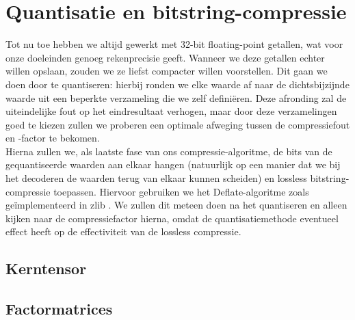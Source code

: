 \section{Quantisatie en bitstring-compressie}

Tot nu toe hebben we altijd gewerkt met 32-bit floating-point getallen, wat voor onze doeleinden genoeg rekenprecisie geeft. Wanneer we deze getallen echter willen opslaan, zouden we ze liefst compacter willen voorstellen. Dit gaan we doen door te quantiseren: hierbij ronden we elke waarde af naar de dichtsbijzijnde waarde uit een beperkte verzameling die we zelf defini\"eren. Deze afronding zal de uiteindelijke fout op het eindresultaat verhogen, maar door deze verzamelingen goed te kiezen zullen we proberen een optimale afweging tussen de compressiefout en -factor te bekomen.\\

Hierna zullen we, als laatste fase van ons compressie-algoritme, de bits van de gequantiseerde waarden aan elkaar hangen (natuurlijk op een manier dat we bij het decoderen de waarden terug van elkaar kunnen scheiden) en lossless bitstring-compressie toepassen. Hiervoor gebruiken we het Deflate-algoritme \cite{ref:deflate} zoals ge\"implementeerd in zlib \cite{ref:zlib}. We zullen dit meteen doen na het quantiseren en alleen kijken naar de compressiefactor hierna, omdat de quantisatiemethode eventueel effect heeft op de effectiviteit van de lossless compressie.

\subsection{Kerntensor}

\subsection{Factormatrices}
